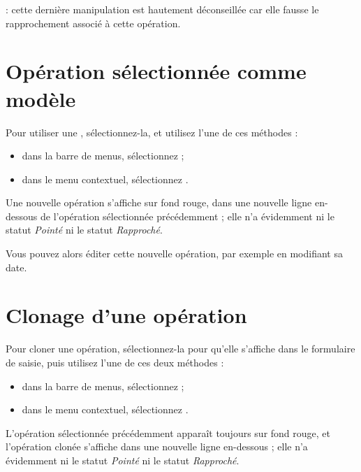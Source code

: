  : cette dernière manipulation est hautement déconseillée car elle fausse le rapprochement associé à cette opération.


\section{Opération sélectionnée comme modèle\label{transactions-model}}


Pour utiliser une , sélectionnez-la, et utilisez l'une de ces méthodes :
\begin{itemize}
	 \item dans la barre de menus, sélectionnez  ;
	 \item dans le menu contextuel, sélectionnez .
\end{itemize}

Une nouvelle opération s'affiche sur fond rouge{\couleur}, dans une nouvelle ligne en-dessous de l'opération sélectionnée précédemment ; elle n'a évidemment ni le statut \emph{Pointé} ni le statut \emph{Rapproché}.

Vous pouvez alors éditer cette nouvelle opération, par exemple en modifiant sa date.


\section{Clonage d'une opération\label{transactions-duplicate}}


Pour cloner une opération, sélectionnez-la pour qu'elle s'affiche dans le formulaire de saisie, puis utilisez l'une de ces deux méthodes :

\begin{itemize}
	 \item dans la barre de menus, sélectionnez  ;
	 \item dans le menu contextuel, sélectionnez .
\end{itemize}

L'opération sélectionnée précédemment apparaît toujours sur fond rouge{\couleur}, et l'opération clonée s'affiche dans une nouvelle ligne en-dessous ; elle n'a évidemment ni le statut \emph{Pointé} ni le statut \emph{Rapproché}.

